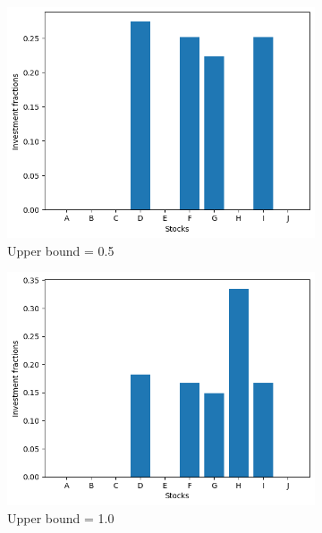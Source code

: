 \begin{figure}[H]
    \begin{subfigure}{0.5\textwidth}
        \includegraphics[width=\textwidth]{lab12/imgs/norm_05.png}
        \caption{Upper bound = 0.5}
    \end{subfigure}
    \begin{subfigure}{0.5\textwidth}
        \includegraphics[width=\textwidth]{lab12/imgs/norm_10.png}
        \caption{Upper bound = 1.0}
    \end{subfigure}\\
    \begin{subfigure}{0.5\textwidth}

\end{subfigure}
\end{figure}
